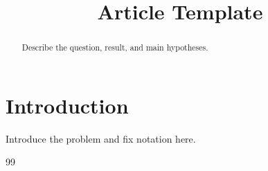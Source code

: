 \documentclass[12pt]{amsart}
\begin{document}


%
\title{Article Template}



\begin{abstract}
Describe the question, result, and main hypotheses.
\end{abstract}
\maketitle


\section{Introduction}

Introduce the problem and fix notation here.
% 
% 

\begin{thebibliography}{99}
\setlength{\itemsep}{-\parsep}

\end{thebibliography}
\end{document}
